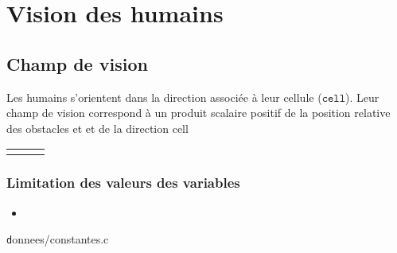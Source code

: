 %
\section{Vision des humains}
%
%
\subsection{Champ de vision}
Les humains s'orientent dans la direction associée à leur cellule ($\mathtt{cell}$). Leur champ de vision correspond à un produit scalaire positif de la position relative des obstacles et et de la direction cell
\begin{center}
	\begin{tabular}{rcl}
	 & \\
	\end{tabular}
\end{center}
%
%
%
\subsubsection{Limitation des valeurs des variables}
%

\begin{itemize}[label=, leftmargin=2cm]
\item 
\end{itemize}
%
{\texttt donnees/constantes.c}
%
